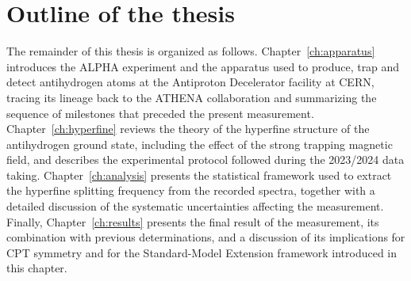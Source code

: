\section{Outline of the thesis}

The remainder of this thesis is organized as follows. Chapter~\ref{ch:apparatus} introduces the ALPHA experiment and the apparatus used to produce, trap and detect antihydrogen atoms at the Antiproton Decelerator facility at CERN, tracing its lineage back to the ATHENA collaboration and summarizing the sequence of milestones that preceded the present measurement. Chapter~\ref{ch:hyperfine} reviews the theory of the hyperfine structure of the antihydrogen ground state, including the effect of the strong trapping magnetic field, and describes the experimental protocol followed during the 2023/2024 data taking. Chapter~\ref{ch:analysis} presents the statistical framework used to extract the hyperfine splitting frequency from the recorded spectra, together with a detailed discussion of the systematic uncertainties affecting the measurement. Finally, Chapter~\ref{ch:results} presents the final result of the measurement, its combination with previous determinations, and a discussion of its implications for CPT symmetry and for the Standard-Model Extension framework introduced in this chapter.